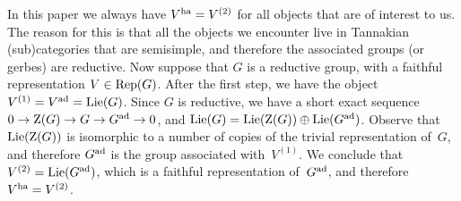 \documentclass[10pt,twoside,leqno]{article}
\numberwithin{equation}{subsection}
\newcommand{\Rep}{\textnormal{Rep}}
\newcommand{\Lie}{\textnormal{Lie}}
\newcommand{\ad}{\textnormal{ad}}
\newcommand{\ha}{\textnormal{ha}}
\newcommand{\Zentrum}{\textnormal{Z}}
\begin{document}
\begin{remark} %
 In this paper we always have $V^\ha = V^{(2)}$
 for all objects that are of interest to us.
 The reason for this is that all the objects we encounter live in
 Tannakian (sub)categories that are semisimple,
 and therefore the associated groups (or gerbes) are reductive.
 Now suppose that $G$ is a reductive group,
 with a faithful representation $V \in \Rep(G)$.
 After the first step, we have the object $V^{(1)} = V^\ad = \Lie(G)$.
 Since $G$ is reductive, we have a short exact sequence
 $0 \to \Zentrum(G) \to G \to G^\ad \to 0$,
 and $\Lie(G) = \Lie(\Zentrum(G)) \oplus \Lie(G^\ad)$.
 Observe that $\Lie(\Zentrum(G))$ is isomorphic
 to a number of copies of the trivial representation of~$G$,
 and therefore $G^\ad$ is the group associated with~$V^{(1)}$.
 We conclude that $V^{(2)} = \Lie(G^\ad)$,
 which is a faithful representation of~$G^\ad$,
 and therefore $V^\ha = V^{(2)}$.
\end{remark}
\end{document}
